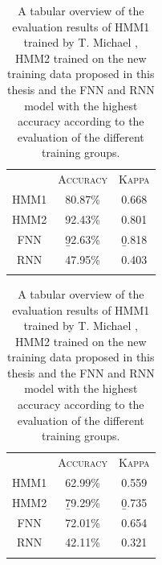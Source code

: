 \vspace{.5em}
\begin{table}[!ht]
	\centering
	\hfill
	{\centering\small{}\begin{tabular}{ c c c }
	\trule
	 & \textsc{Accuracy} & \textsc{Kappa} \\
	\srule
	HMM1 & 80.87\%     & 0.668     \\
	\mrule
	HMM2 & 92.43\%     & 0.801     \\
	\mrule
	FNN  & \b{92.63\%} & \b{0.818} \\
	\mrule
	RNN  & 47.95\%     & 0.403     \\
	\brule
	\end{tabular}}
	\hfill
	{\centering\small{}\begin{tabular}{ c c c }
	\trule
	 & \textsc{Accuracy} & \textsc{Kappa} \\
	\srule
	HMM1 & 62.99\%     & 0.559     \\
	\mrule
	HMM2 & \b{79.29\%} & \b{0.735} \\
	\mrule
	FNN  & 72.01\%     & 0.654     \\
	\mrule
	RNN  & 42.11\%     & 0.321     \\
	\brule
	\end{tabular}}
	\hfill
	\vspace{.8em}
	\caption[Comparison of all Architectures]{A tabular overview of the evaluation results of HMM1 trained by T. Michael \cite{michael2016}, HMM2 trained on the new training data proposed in this thesis and the FNN and RNN model with the highest accuracy according to the evaluation of the different training groups.}
	\label{t.evaluation.comparison}
\end{table}

